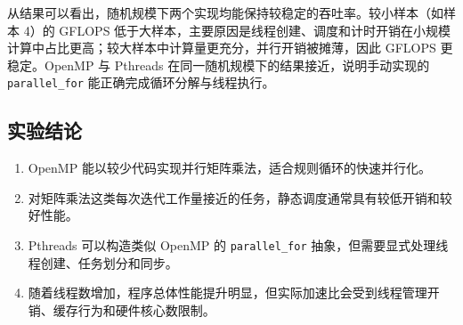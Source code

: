 \documentclass[12pt,a4paper]{ctexart}
\begin{document}
从结果可以看出，随机规模下两个实现均能保持较稳定的吞吐率。较小样本（如样本 4）的 GFLOPS 低于大样本，主要原因是线程创建、调度和计时开销在小规模计算中占比更高；较大样本中计算量更充分，并行开销被摊薄，因此 GFLOPS 更稳定。OpenMP 与 Pthreads 在同一随机规模下的结果接近，说明手动实现的 \texttt{parallel\_for} 能正确完成循环分解与线程执行。

\subsection*{实验结论}
\begin{enumerate}[itemsep=0.3em]
  \item OpenMP 能以较少代码实现并行矩阵乘法，适合规则循环的快速并行化。
  \item 对矩阵乘法这类每次迭代工作量接近的任务，静态调度通常具有较低开销和较好性能。
  \item Pthreads 可以构造类似 OpenMP 的 \texttt{parallel\_for} 抽象，但需要显式处理线程创建、任务划分和同步。
  \item 随着线程数增加，程序总体性能提升明显，但实际加速比会受到线程管理开销、缓存行为和硬件核心数限制。
\end{enumerate}
\end{document}

